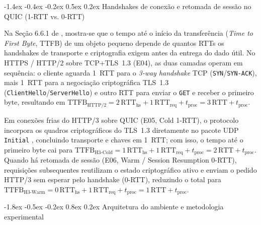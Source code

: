 \documentclass[12pt]{article}
\makeatletter
\renewcommand\section{\@startsection{section}{1}{\z@}%
                       {-1.8ex \@plus -0.5ex \@minus -0.2ex}%
                       {0.8ex \@plus 0.2ex}%
                       {\reset@font\large\bfseries}}
\renewcommand\subsection{\@startsection{subsection}{2}{\z@}%
                       {-1.4ex \@plus -0.4ex \@minus -0.2ex}%
                       {0.5ex \@plus 0.2ex}%
                       {\reset@font\normalsize\bfseries}}
\makeatother
\begin{document}
\subsection{Handshakes de conexão e retomada de sessão no QUIC (1-RTT vs. 0-RTT)}

Na Seção 6.6.1 de \cite{tanenbaum2021}, mostra-se que o tempo até o início da transferência (\textit{Time to First Byte}, TTFB) de um objeto pequeno depende de quantos RTTs os handshakes de transporte e criptografia exigem antes da entrega do dado útil. No HTTPS / HTTP/2 sobre TCP+TLS~1.3 (E04), as duas camadas operam em sequência: o cliente aguarda 1~RTT para o \textit{3-way handshake} TCP (\texttt{SYN}/\texttt{SYN-ACK}), mais 1~RTT para a negociação criptográfica TLS~1.3 (\texttt{ClientHello}/\texttt{ServerHello}) e outro RTT para enviar o \texttt{GET} e receber o primeiro byte, resultando em $\text{TTFB}_{\text{HTTP/2}} = 2\,\text{RTT}_{\text{hs}} + 1\,\text{RTT}_{\text{req}} + t_{\text{proc}} = 3\,\text{RTT} + t_{\text{proc}}$.

Em conexões frias do HTTP/3 sobre QUIC (E05, Cold 1-RTT), o protocolo incorpora os quadros criptográficos do TLS~1.3 diretamente no pacote UDP \texttt{Initial} \cite{rfc9000,rfc9001}, concluindo transporte e chaves em 1~RTT; com isso, o tempo até o primeiro byte cai para $\text{TTFB}_{\text{H3-Cold}} = 1\,\text{RTT}_{\text{hs}} + 1\,\text{RTT}_{\text{req}} + t_{\text{proc}} = 2\,\text{RTT} + t_{\text{proc}}$. Quando há retomada de sessão (E06, Warm / Session Resumption 0-RTT), requisições subsequentes reutilizam o estado criptográfico ativo e enviam o pedido HTTP/3 sem esperar pelo handshake (0-RTT), reduzindo o total para $\text{TTFB}_{\text{H3-Warm}} = 0\,\text{RTT}_{\text{hs}} + 1\,\text{RTT}_{\text{req}} + t_{\text{proc}} = 1\,\text{RTT} + t_{\text{proc}}$.

\section{Arquitetura do ambiente e metodologia experimental}
\end{document}
